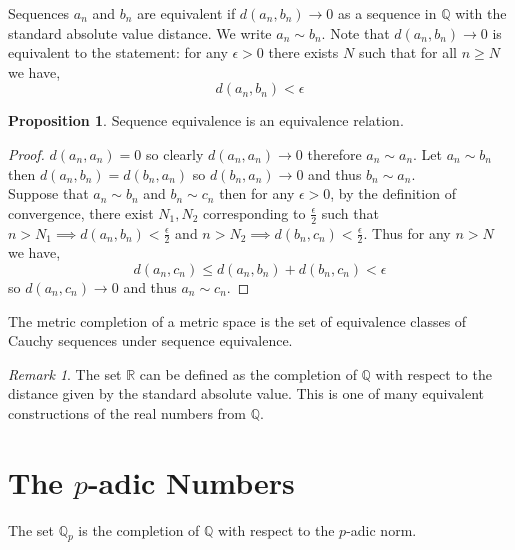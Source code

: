\documentclass{article}
\newcommand{\Q}{\mathbb{Q}}
\newenvironment{definition}[1][Definition:]{\begin{trivlist}
\item[\hskip \labelsep {\bfseries #1}]}{\end{trivlist}}
\theoremstyle{theorem}
\theoremstyle{definition}
\theoremstyle{definition}
\newtheorem*{proposition}{Proposition}
\theoremstyle{remark}
\theoremstyle{definition}
\theoremstyle{remark}
\newtheorem{remark}{Remark}[subsection]
\begin{document}
\begin{definition}
Sequences $a_n$ and $b_n$ are equivalent if $d(a_n, b_n) \to 0$ as a sequence in $\Q$ with the standard absolute value distance. We write $a_n \sim b_n$. Note that $d(a_n, b_n) \to 0$ is equivalent to the statement: for any $\epsilon > 0$ there exists $N$ such that for all $n \ge N$ we have,
\[d(a_n, b_n) < \epsilon\]
\end{definition}

\begin{proposition}
Sequence equivalence is an equivalence relation.
\end{proposition}

\begin{proof}
$d(a_n, a_n) = 0$ so clearly $d(a_n, a_n) \to 0$ therefore $a_n \sim a_n$. Let $a_n \sim b_n$ then $d(a_n, b_n) = d(b_n, a_n)$ so $d(b_n, a_n) \to 0$ and thus $b_n \sim a_n$. \bigskip \\ Suppose that $a_n \sim b_n$ and $b_n \sim c_n$ then for any $\epsilon > 0$, by the definition of convergence, there exist $N_1, N_2$ corresponding to $\frac{\epsilon}{2}$ such that $n > N_1 \implies d(a_n, b_n) < \frac{\epsilon}{2}$ and $n > N_2 \implies d(b_n, c_n) < \frac{\epsilon}{2}$. Thus for any $n > N$ we have, 
\[d(a_n, c_n) \le d(a_n, b_n) + d(b_n, c_n) < \epsilon\]
so $d(a_n, c_n) \to 0$ and thus $a_n \sim c_n$.  
\end{proof}

\begin{definition}
The metric completion of a metric space is the set of equivalence classes of Cauchy sequences under sequence equivalence. 
\end{definition}

\begin{remark}
The set $\mathbb{R}$ can be defined as the completion of $\mathbb{Q}$ with respect to the distance given by the standard absolute value. This is one of many equivalent constructions of the real numbers from $\Q$. 
\end{remark}


\section{The $p$-adic Numbers}

\begin{definition}
The set $\mathbb{Q}_p$ is the completion of $\mathbb{Q}$ with respect to the $p$-adic norm.
\end{definition}
\end{document}
